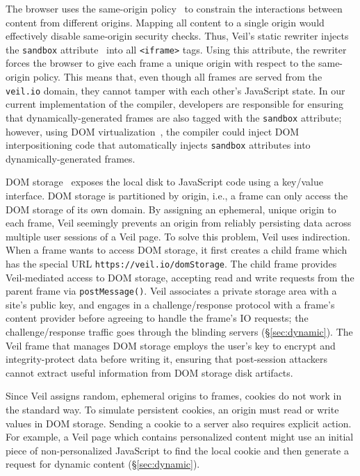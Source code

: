 The browser uses the same-origin policy~\cite{sop}
to constrain the interactions between content
from different origins. Mapping all content to
a single origin would effectively disable
same-origin security checks. Thus, Veil's static
rewriter injects the \texttt{sandbox} attribute~\cite{iframeSandbox}
into all \texttt{<iframe>} tags. Using this
attribute, the rewriter forces the browser
to give each frame a unique origin with respect
to the same-origin policy. This means that,
even though all frames are served from the
\texttt{veil.io} domain, they cannot tamper
with each other's JavaScript state. In our current
implementation of the compiler, developers are
responsible for ensuring that dynamically-generated
frames are also tagged with the \texttt{sandbox}
attribute; however, using DOM virtualization~\cite{treehouse,mugshot},
the compiler could inject DOM interpositioning
code that automatically injects \texttt{sandbox}
attributes into dynamically-generated frames.

DOM storage~\cite{domStorage} exposes the
local disk to JavaScript code using a key/value
interface. DOM storage is partitioned by origin,
i.e., a frame can only access the DOM storage of
its own domain. By assigning an ephemeral, unique
origin to each frame, Veil seemingly prevents
an origin from reliably persisting data across
multiple user sessions of a Veil page. To solve
this problem, Veil uses indirection. When a
frame wants to access DOM storage, it first
creates a child frame which has the special URL
\texttt{https://veil.io/domStorage}. The child
frame provides Veil-mediated access to DOM storage,
accepting read and write requests from the parent
frame via \texttt{postMessage()}. Veil associates
a private storage area with a site's public key,
and engages in a challenge/response protocol
with a frame's content provider before agreeing
to handle the frame's IO requests; the challenge/response
traffic goes through the blinding servers (\S\ref{sec:dynamic}).
The Veil frame that manages DOM storage employs
the user's key to encrypt and
integrity-protect data before writing it,
ensuring that post-session attackers cannot
extract useful information from DOM storage
disk artifacts.

Since Veil assigns random, ephemeral origins
to frames, cookies do not work in the standard
way. To simulate persistent cookies, an origin
must read or write values in DOM storage. Sending
a cookie to a server also requires explicit
action. For example, a Veil page which contains
personalized content might use an initial piece
of non-personalized JavaScript to find the local
cookie and then generate a request for dynamic
content (\S\ref{sec:dynamic}).

